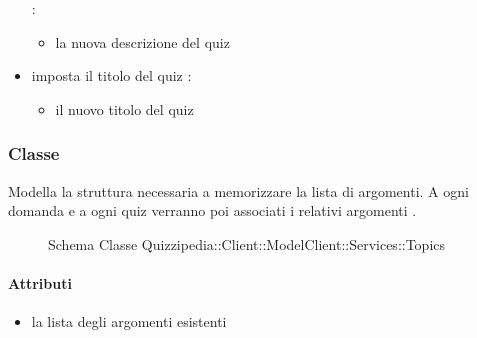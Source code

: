 \begin{itemize}
 :
\begin{itemize}
\item {}
\newline
la nuova descrizione del quiz
\end{itemize}
\item {}
\newline
imposta il titolo del quiz
\newline
{} :
\begin{itemize}
\item {}
\newline
il nuovo titolo del quiz
\end{itemize}
\end{itemize}
\subsubsection{Classe }
Modella la struttura necessaria a memorizzare la lista di argomenti. A ogni domanda e a ogni quiz verranno poi associati i relativi argomenti .
\begin{figure}[H]
\centering
\noindent{}
\caption[Schema Classe Topics]{Schema Classe Quizzipedia::Client::ModelClient::Services::Topics}
\end{figure}
\paragraph{Attributi}
\begin{itemize}
\item {}
\newline
la lista degli argomenti esistenti
\end{itemize}

